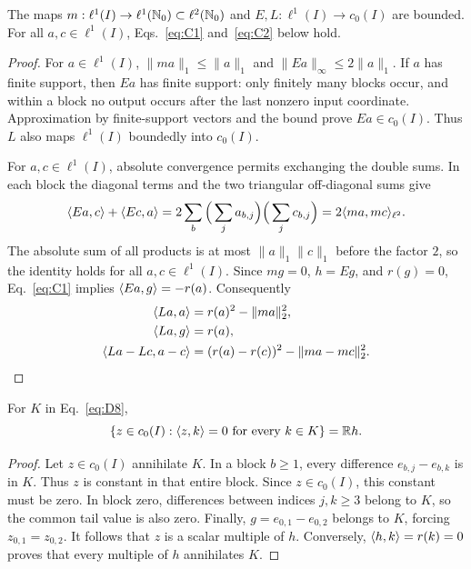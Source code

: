 \begin{lemma}
\label{lem:coordinate-pairing}
The maps $m:\ell^1(I)\to\ell^1(\mathbb N_0)\subset\ell^2(\mathbb N_0)$ and
$E,L:\ell^1(I)\to c_0(I)$ are bounded. For all $a,c\in\ell^1(I)$,
Eqs.~\eqref{eq:C1} and~\eqref{eq:C2} below hold.
\end{lemma}
\begin{proof}
\label{sec:C1}
For $a\in\ell^1(I)$, $\|ma\|_1\le\|a\|_1$ and
$\|Ea\|_\infty\le2\|a\|_1$. If $a$ has finite support, then $Ea$ has
finite support: only finitely many blocks occur, and within a block no
output occurs after the last nonzero input coordinate. Approximation by
finite-support vectors and the bound prove $Ea\in c_0(I)$.
Thus $L$ also maps $\ell^1(I)$ boundedly into $c_0(I)$.

For $a,c\in\ell^1(I)$, absolute convergence permits exchanging the double
sums. In each block the diagonal terms and the two triangular
off-diagonal sums give
\begin{equation}
\langle Ea,c\rangle+\langle Ec,a\rangle
 =2\sum_b\Big(\sum_j a_{b,j}\Big)\Big(\sum_j c_{b,j}\Big)
 =2\langle ma,mc\rangle_{\ell^2}.
\label{eq:C1}
\end{equation}
The absolute sum of all products is at most $\|a\|_1\|c\|_1$ before the
factor $2$, so the identity holds for all $a,c\in\ell^1(I)$. Since $mg=0$, $h=Eg$,
and $r(g)=0$, Eq.~\eqref{eq:C1} implies $\langle Ea,g\rangle=-r(a)$.
Consequently
\begin{equation}
\begin{aligned}
\langle La,a\rangle&=r(a)^2-\|ma\|_2^2,\\
\langle La,g\rangle&=r(a),\\
\langle La-Lc,a-c\rangle&=(r(a)-r(c))^2-\|ma-mc\|_2^2.
\end{aligned}
\label{eq:C2}
\end{equation}
\end{proof}

\begin{lemma}
\label{lem:coordinate-annihilator}
For $K$ in Eq.~\eqref{eq:D8},
\[
\{z\in c_0(I):\langle z,k\rangle=0\ \text{for every }k\in K\}=\mathbb R h.
\]
\end{lemma}
\begin{proof}
Let $z\in c_0(I)$ annihilate $K$. In a block $b\ge1$, every
difference $e_{b,j}-e_{b,k}$ is in $K$. Thus $z$ is constant in that
entire block. Since $z\in c_0(I)$, this constant must be zero. In block
zero, differences between indices $j,k\ge3$ belong to $K$, so the common
tail value is also zero. Finally, $g=e_{0,1}-e_{0,2}$ belongs to $K$,
forcing $z_{0,1}=z_{0,2}$. It follows that $z$ is a scalar multiple of
$h$. Conversely, $\langle h,k\rangle=r(k)=0$ proves that every multiple of $h$
annihilates $K$.
\end{proof}

